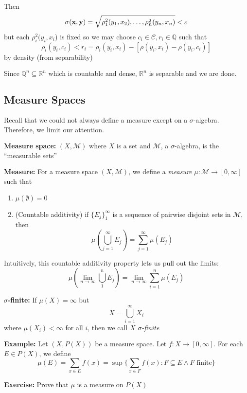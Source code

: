 \documentclass[12pt]{report}
\newcommand{\R}{\mathbb{R}}
\newcommand{\Q}{\mathbb{Q}}
\newcommand{\ep}{\varepsilon}
\newcommand{\B}{\mathcal{B}}
\newcommand{\M}{\mathcal{M}}
\newcommand{\sub}{\subseteq}
\newcommand*{\tbf}[1]{\ifmmode\mathbf{#1}\else\textbf{#1}\fi}
\newenvironment*{tbox}[2][gray]{
    \begin{tcolorbox}[
        parbox=false,
        colback=#1!5!white,
        colframe=#1!75!black,
        breakable,
        title={#2}
    ]}
    {\end{tcolorbox}}
\newenvironment*{exercise}[1][red]{
    \begin{tcolorbox}[
        parbox=false,
        colback=#1!5!white,
        colframe=#1!75!black,
        breakable
    ]}
    {\end{tcolorbox}}
\newenvironment*{proof}[1][blue]{
\begin{tcolorbox}[
    parbox=false,
    colback=#1!5!white,
    colframe=#1!75!black,
    breakable
]}
{\end{tcolorbox}}
\begin{document}
\begin{tbox}{\textbf{Proposition:} $B_{\R^n}$ is $\bigotimes_{i=1}^n \B_{\R}$ }
\begin{proof}
            Then 
            \[\sigma(\tbf{x}, \tbf{y}) = \sqrt{\rho_1^2(y_1, x_2), \dots, \rho_n^2(y_n, x_n)} < \ep\]
            but each $\rho_i^2(y_i, x_i$) is fixed so we may choose $c_i \in \mathcal C, r_i \in \Q$ such that 
            \[\rho_i(y_i, c_i) < r_i = \rho_i(y_i, x_i) - [\rho(y_i, x_i) - \rho(y_i, c_i)]\]
            by density (from separability) 


        \end{proof}

        Since $\Q^n \sub \R^n$ which is countable and dense, $\R^n$ is separable and we are done. 
    \end{tbox}

    \subsection*{Measure Spaces}
        Recall that we could not always define a measure except on a $\sigma$-algebra. Therefore, we limit our attention.

        \textbf{Measure space:} $(X, \M)$ where $X$ is a set and $\M$, a $\sigma$-algebra, is the ``measurable sets''

        \textbf{Measure:} For a measure space $(X, \M)$, we define a \emph{measure} $\mu: \M \to [0, \infty]$ such that 
        \begin{enumerate}
            \item $\mu(\emptyset) = 0$
            \item (Countable additivity) if $\{E_j\}_1^{\infty}$ is a sequence of pairwise disjoint sets in $\M$, then 
            \[\mu\left(\bigcup_{j=1}^{\infty} E_j\right) = \sum_{j=1}^{\infty} \mu(E_j)\] 
        \end{enumerate}

        Intuitively, this countable additivity property lets us pull out the limits:
        \[\mu\left(\lim_{n \to \infty} \bigcup_{1}^n E_j\right) = \lim_{n\to \infty} \sum_{i=1}^n \mu(E_j)\] 

        \textbf{$\sigma$-finite:} If $\mu(X) = \infty$ but 
        \[X = \bigcup_{i=1}^{\infty} X_i\]
        where $\mu(X_i) < \infty$ for all $i$, then we call $X$ \emph{$\sigma$-finite}

        \textbf{Example:} Let $(X, P(X))$ be a measure space. Let $f: X \to [0, \infty]$. For each $E \in P(X)$, we define 
        \[\mu(E) = \sum_{x \in E} f(x) = \sup\{\sum_{x \in F} f(x): F \sub E \land F \text{ finite}\}\] 

        \begin{exercise}
            \textbf{Exercise:} Prove that $\mu$ is a measure on $P(X)$
        \end{exercise}
\end{document}
